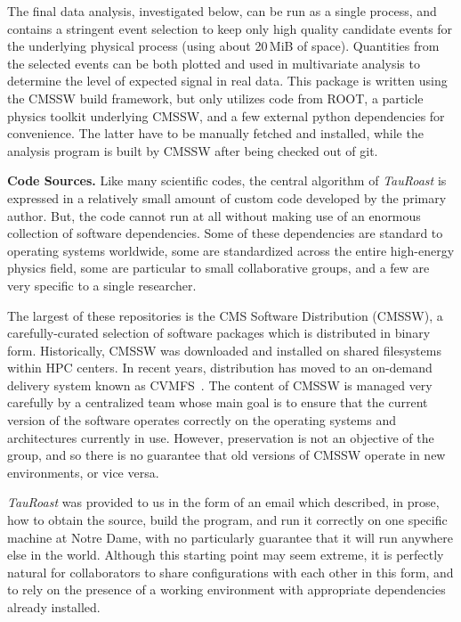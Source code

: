 \documentclass{acm_proc_article-sp}
\begin{document}
The final data analysis, investigated below, can be run as a single
process, and contains a stringent event selection to keep only high
quality candidate events for the underlying physical process (using
about 20$\,$MiB of space).  Quantities from the selected events can be
both plotted and used in multivariate analysis to determine the level
of expected signal in real data.
This package is written using the CMSSW build framework,
but only utilizes code from ROOT,
a particle physics toolkit underlying CMSSW,
and a few external python dependencies for convenience.
The latter have to be manually fetched and installed,
while the analysis program is built by CMSSW after being checked out of git.

{\bf Code Sources.} Like many scientific codes, the central algorithm
of \emph{TauRoast} is expressed in a relatively small amount of
custom code developed by the primary author.  But, the code cannot
run at all without making use of an enormous collection of software
dependencies.  Some of these dependencies are standard to operating
systems worldwide, some are standardized across the entire high-energy
physics field, some are particular to small collaborative groups,
and a few are very specific to a single researcher.

The largest of these repositories is the CMS Software Distribution (CMSSW),
a carefully-curated selection of software packages which is distributed
in binary form.  Historically, CMSSW was downloaded and installed on shared
filesystems within HPC centers.  In recent years, distribution has moved to
an on-demand delivery system known as CVMFS~\cite{blomer2011cernvm}.  The content
of CMSSW is managed very carefully by a centralized team whose main goal
is to ensure that the current version of the software operates correctly
on the operating systems and architectures currently in use.  However,
preservation is not an objective of the group, and so there is
no guarantee that old versions of CMSSW operate in new environments,
or vice versa. 

\emph{TauRoast} was provided to us in the form of an
email which described, in prose, how to obtain the source,
build the program, and run it correctly on one specific
machine at Notre Dame, with no particularly guarantee that
it will run anywhere else in the world.
Although this starting point may seem extreme, it is
perfectly natural for collaborators to share configurations
with each other in this form, and to rely on the presence
of a working environment with appropriate dependencies already
installed.
\end{document}
